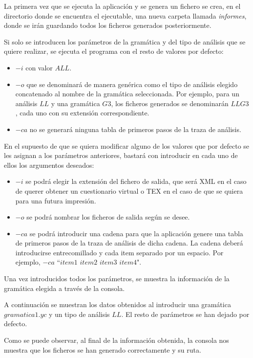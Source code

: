 La primera vez que se ejecuta la aplicación y se genera un fichero se crea, en el directorio donde se encuentra el ejecutable, una nueva carpeta llamada \textit{informes}, donde se irán guardando todos los ficheros generados posteriormente.

Si solo se introducen los parámetros de la gramática y del tipo de análisis que se quiere realizar, se ejecuta el programa con el resto de valores por defecto:
\begin{itemize}
\item $-i$ con valor $ALL$.
\item $-o$ que se denominará de manera genérica como el tipo de análisis elegido concatenado al nombre de la gramática seleccionada. Por ejemplo, para un análisis $LL$ y una gramática $G3$, los ficheros generados se denominarán $LLG3$, cada uno con su extensión correspondiente.
\item $-ca$ no se generará ninguna tabla de primeros pasos de la traza de análisis.
\end{itemize}


En el supuesto de que se quiera modificar alguno de los valores que por defecto se les asignan a los parámetros anteriores, bastará con introducir en cada uno de ellos los argumentos deseados:
\begin{itemize}
\item $-i$ se podrá elegir la extensión del fichero de salida, que será XML en el caso de querer obtener un cuestionario virtual o TEX en el caso de que se quiera para una futura impresión.
\item $-o$ se podrá nombrar los ficheros de salida según se desee.
\item $-ca$ se podrá introducir una cadena para  que la aplicación genere una tabla de primeros pasos de la traza de análisis de dicha cadena.
La cadena deberá introducirse entrecomillado y cada item separado por un espacio. Por ejemplo, $-ca$ ``$item1$ $item2$ $item3$ $item4$".
\end{itemize}


Una vez introducidos todos los parámetros, se muestra la información de la gramática elegida a través de la consola.

A continuación se muestran los datos obtenidos al introducir una gramática $gramatica1.yc$ y un tipo de análisis $LL$. El resto de parámetros se han dejado por defecto.


Como se puede observar, al final de la información obtenida, la consola nos muestra que los ficheros se han generado correctamente y su ruta.


